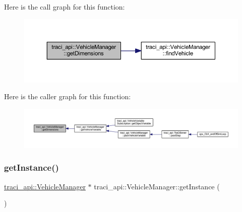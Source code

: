 Here is the call graph for this function\+:
\nopagebreak
\begin{figure}[H]
\begin{center}
\leavevmode
\includegraphics[width=350pt]{classtraci__api_1_1_vehicle_manager_a626f8aea7366479ec9bdd49f58f5b530_cgraph}
\end{center}
\end{figure}
Here is the caller graph for this function\+:
\nopagebreak
\begin{figure}[H]
\begin{center}
\leavevmode
\includegraphics[width=350pt]{classtraci__api_1_1_vehicle_manager_a626f8aea7366479ec9bdd49f58f5b530_icgraph}
\end{center}
\end{figure}
\mbox{\label{classtraci__api_1_1_vehicle_manager_a2f2e2b5647eda9af94094da62788cd2e}} 
\subsubsection{\texorpdfstring{get\+Instance()}{getInstance()}}
{\footnotesize\ttfamily \hyperlink{classtraci__api_1_1_vehicle_manager}{traci\+\_\+api\+::\+Vehicle\+Manager} $\ast$ traci\+\_\+api\+::\+Vehicle\+Manager\+::get\+Instance (\begin{DoxyParamCaption}{ }\end{DoxyParamCaption})\hspace{0.3cm}{\ttfamily [static]}}

